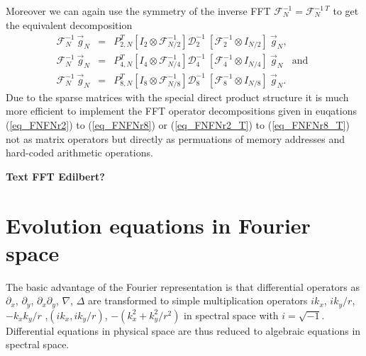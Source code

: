 Moreover we can again use the symmetry of the inverse FFT 
$\mathcal{F}^{-1}_{N} = \mathcal{F}^{-1 \ T}_{N}$ to get the
equivalent decomposition
\begin{eqnarray}  \label{eq_FNFNr2_Tinverse}
 \mathcal{F}^{-1}_{N} \ \vec{g}_{N}
  &=&
 P^{T}_{2,N}
 \left[I_{2} \otimes \mathcal{F}^{-1}_{N/2} \right]
 \mathcal{D}^{-1}_{2} \ 
 \left[\mathcal{F}^{-1}_{2} \otimes I_{N/2} \right] \ 
 \vec{g}_{N},
  \\ \label{eq_FNFNr4_Tinverse}
 \mathcal{F}^{-1}_{N} \ \vec{g}_{N}
  &=&
 P^{T}_{4,N}
 \left[I_{4} \otimes \mathcal{F}^{-1}_{N/4} \right] 
 \mathcal{D}^{-1}_{4} \ 
 \left[\mathcal{F}^{-1}_{4} \otimes I_{N/4} \right] \ 
 \vec{g}_{N}
 \ \ \ \ \mbox{and} \ \
  \\ \label{eq_FNFNr8_Tinverse}
 \mathcal{F}^{-1}_{N} \ \vec{g}_{N}
  &=&
  P^{T}_{8,N}
 \left[I_{8} \otimes \mathcal{F}^{-1}_{N/8} \right]
 \mathcal{D}^{-1}_{8} \
 \left[\mathcal{F}^{-1}_{8} \otimes I_{N/8} \right] \ 
 \vec{g}_{N}.
\end{eqnarray}
Due to the sparse matrices with the special direct product structure 
it is much more efficient to implement the FFT operator decompositions 
given in euqations 
(\ref{eq_FNFNr2}) to (\ref{eq_FNFNr8}) or (\ref{eq_FNFNr2_T}) to
(\ref{eq_FNFNr8_T}) not as matrix operators but directly as permuations
of memory addresses and hard-coded arithmetic operations.



\vspace{0.5cm}
{\large \bf Text FFT Edilbert?}
%
\section{Evolution equations in Fourier space}
%
\label{ssec_evolfourier}
The basic advantage of the Fourier representation is that
differential operators as $\partial_{x}$,
$\partial_{y}$, $\partial_{x} \partial_{y}$, $\nabla$, $\Delta$
are transformed to simple multiplication operators
$i k_{x}$, $i k_{y}/r$, $- k_{x} k_{y}/r$ ,$(i k_{x},i k_{y}/r)$, 
$-(k_{x}^{2} + k_{y}^{2}/r^{2})$ in spectral space with $i = \sqrt{-1}$.
Differential equations in physical space are thus reduced to algebraic 
equations in spectral space.

